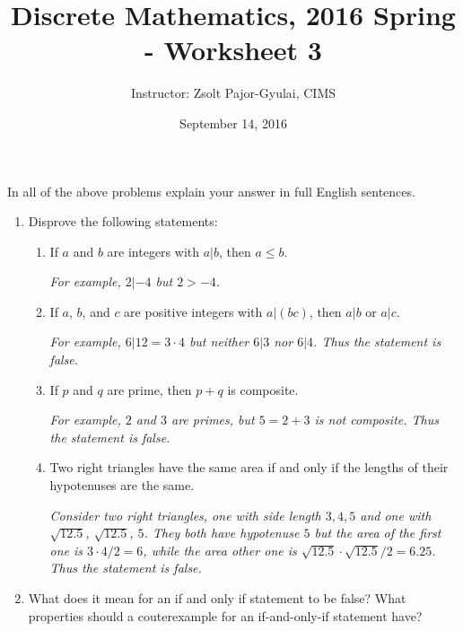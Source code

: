 \documentclass[11pt]{preprint}
\title{Discrete Mathematics, 2016 Spring - Worksheet 3}
\author{Instructor: Zsolt Pajor-Gyulai, CIMS}
\date{September 14, 2016}
\begin{document}
\maketitle

In all of the above problems explain your answer in full English sentences.

\begin{enumerate}
\item Disprove the following statements:
\begin{enumerate}
\item If $a$ and $b$ are integers with $a|b$, then $a\leq b$.

\vspace{0.1cm}
\textit{For example, $2|-4$ but $2>-4$.}
\vspace{0.1cm}

\item If $a$, $b$, and $c$ are positive integers with $a|(bc)$, then $a|b$ or $a|c$.

\vspace{0.1cm}
\textit{For example, $6|12=3\cdot 4$ but neither $6|3$ nor $6|4$. Thus the statement is false.}
\vspace{0.1cm}

\item If $p$ and $q$ are prime, then $p+q$ is composite.

\vspace{0.1cm}
\textit{For example, $2$ and $3$ are primes, but $5=2+3$ is not composite. Thus the statement is false.}
\vspace{0.1cm}

\item Two right triangles have the same area if and only if the lengths of their hypotenuses are the same.

\vspace{0.1cm}
\textit{Consider two right triangles, one with side length $3, 4, 5$ and one with $\sqrt{12.5}$, $\sqrt{12.5}$, $5$. They both have hypotenuse $5$ but the area of the first one is $3\cdot 4/2=6$, while the area other one is $\sqrt{12.5}\cdot\sqrt{12.5}/2=6.25$. Thus the statement is false.}
\vspace{0.1cm}

\end{enumerate}

\item What does it mean for an if and only if statement to be false? What properties should a couterexample for an if-and-only-if statement have?


\end{enumerate}
\end{document}
